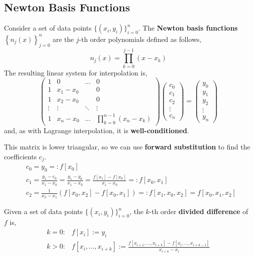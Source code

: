 \subsection{Newton Basis Functions}
Consider a set of data points $\{(x_i, y_i)\}_{i=0}^n$. The \textbf{Newton basis functions} $\left\{n_j(x)\right\}_{j=0}^n$ are the $j$-th order polynomials defined as follows,
\[n_j(x)=\prod_{k=0}^{j-1}\left(x-x_k\right)\]
The resulting linear system for interpolation is,
\[
\left(\begin{array}{cccc}
1 & 0 & \ldots & 0 \\
1 & x_1-x_0 & & 0 \\
1 & x_2-x_0 & & 0 \\
\vdots & \vdots & \ddots & \vdots \\
1 & x_n-x_0 & \ldots & \prod_{k=0}^{n-1}\left(x_n-x_k\right)
\end{array}\right) \left(\begin{array}{c}
c_0 \\
c_1 \\
c_2 \\
\vdots \\
c_n
\end{array}\right)=\left(\begin{array}{c}
y_0 \\
y_1 \\
y_2 \\
\vdots \\
y_n
\end{array}\right)
\]
and, as with Lagrange interpolation, it is \textbf{well-conditioned}.

\begin{rmk}
    This matrix is lower triangular, so we can use \textbf{forward substitution} to find the coefficients $c_j$.
    \begin{align*}
        &c_0=y_0=: f\left[x_0\right] \\
        &c_1=\frac{y_1-c_0}{x_1-x_0}=\frac{y_1-y_0}{x_1-x_0}=\frac{f\left[x_1\right]-f\left[x_0\right]}{x_1-x_0}=: f\left[x_0, x_1\right] \\
        &c_2=\frac{1}{x_2-x_1}\left(f\left[x_0, x_2\right]-f\left[x_0, x_1\right]\right)=: f\left[x_1, x_0, x_2\right]=f\left[x_0, x_1, x_2\right]
    \end{align*}
\end{rmk}

\begin{defn}
    Given a set of data points $\{(x_i, y_i)\}_{i=0}^n$, the $k$-th order \textbf{divided difference} of $f$ is,
    \[
    \begin{array}{ll}
        k=0: & f\left[x_i\right]:=y_i \\
        k>0: & f\left[x_i, \ldots, x_{i+k}\right]:=\frac{f\left[x_{i+1}, \ldots, x_{i+k}\right]-f\left[x_i, \ldots, x_{i+k-1}\right]}{x_{i+k}-x_i}
    \end{array}
    \]
\end{defn}

